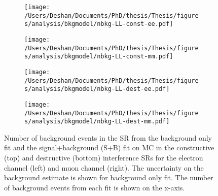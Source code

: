 \begin{figure}[h!]
    \centering
    \begin{subfigure}[b]{0.49\textwidth}
        \centering
        \texttt{[image: /Users/Deshan/Documents/PhD/thesis/Thesis/figures/analysis/bkgmodel/nbkg-LL-const-ee.pdf]}
        \label{fig:bkgmodel:fitsbplusb1}
    \end{subfigure}
    \begin{subfigure}[b]{0.49\textwidth}
        \centering
        \texttt{[image: /Users/Deshan/Documents/PhD/thesis/Thesis/figures/analysis/bkgmodel/nbkg-LL-const-mm.pdf]}
        \label{fig:bkgmodel:fitsbplusb2}
    \end{subfigure}
    \begin{subfigure}[b]{0.49\textwidth}
        \centering
        \texttt{[image: /Users/Deshan/Documents/PhD/thesis/Thesis/figures/analysis/bkgmodel/nbkg-LL-dest-ee.pdf]}
        \label{fig:bkgmodel:fitsbplusb3}
    \end{subfigure}
    \begin{subfigure}[b]{0.49\textwidth}
        \centering
        \texttt{[image: /Users/Deshan/Documents/PhD/thesis/Thesis/figures/analysis/bkgmodel/nbkg-LL-dest-mm.pdf]}
        \label{fig:bkgmodel:fitsbplusb4}
    \end{subfigure}
    \caption[Background estimation comparisons of the signal+background fit and background only fit]{Number of background events in the SR from the background only fit and the signal+background (S+B) fit on MC in the constructive (top) and destructive (bottom) interference SRs for the electron channel (left) and muon channel (right). The uncertainty on the background estimate is shown for background only fit. The number of background events from each fit is shown on the x-axis.}
    \label{fig:bkgmodel:fitsbplusb}
\end{figure}

